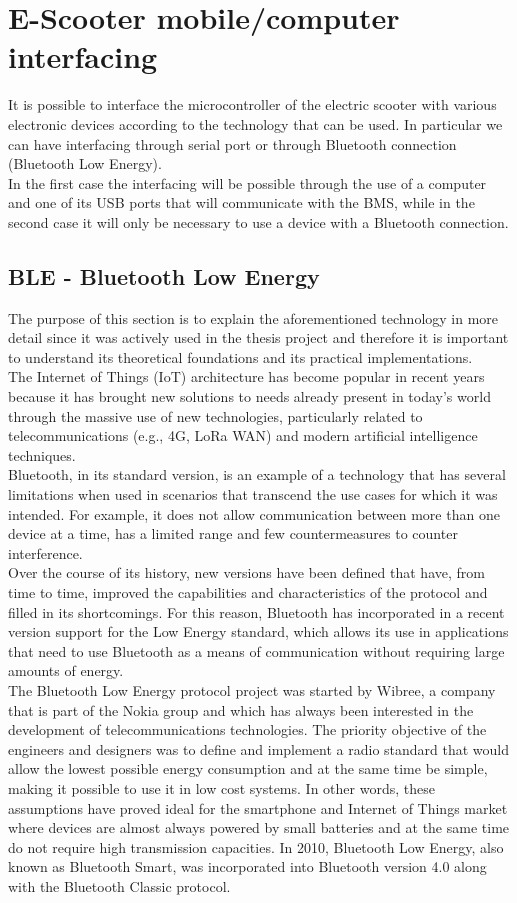 \documentclass[binding=0.6cm,LaM,noexaminfo]{sapthesis}
\begin{document}
\chapter{E-Scooter mobile/computer interfacing}
It is possible to interface the microcontroller of the electric scooter with various electronic devices according to the technology that can be used. In particular we can have interfacing through serial port or through Bluetooth connection (Bluetooth Low Energy).\\
In the first case the interfacing will be possible through the use of a computer and one of its USB ports that will communicate with the BMS, while in the second case it will only be necessary to use a device with a Bluetooth connection.


\section{BLE - Bluetooth Low Energy}
The purpose of this section is to explain the aforementioned technology in more detail since it was actively used in the thesis project and therefore it is important to understand its theoretical foundations and its practical implementations.\\
The Internet of Things (IoT) architecture has become popular in recent years because it has brought new solutions to needs already present in today's world through the massive use of new technologies, particularly related to telecommunications (e.g., 4G, LoRa WAN) and modern artificial intelligence techniques.\\
Bluetooth, in its standard version, is an example of a technology that has several limitations when used in scenarios that transcend the use cases for which it was intended. For example, it does not allow communication between more than one device at a time, has a limited range and few countermeasures to counter interference.\\
Over the course of its history, new versions have been defined that have, from time to time, improved the capabilities and characteristics of the protocol and filled in its shortcomings.
For this reason, Bluetooth has incorporated in a recent version support for the Low Energy standard, which allows its use in applications that need to use Bluetooth as a means of communication without requiring large amounts of energy.\\
The Bluetooth Low Energy protocol project was started by Wibree, a company that is part of the Nokia group and which has always been interested in the development of telecommunications technologies. The priority objective of the engineers and designers was to define and implement a radio standard that would allow the lowest possible energy consumption and at the same time be simple, making it possible to use it in low cost systems. In other words, these assumptions have proved ideal for the smartphone and Internet of Things market where devices are almost always powered by small batteries and at the same time do not require high transmission capacities. In 2010, Bluetooth Low Energy, also known as Bluetooth Smart, was incorporated into Bluetooth version 4.0 along with the Bluetooth Classic protocol. \\
\end{document}

